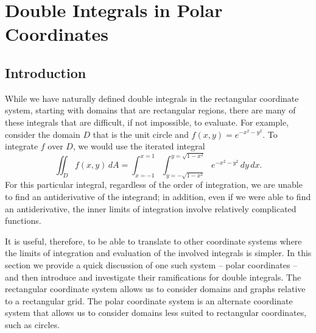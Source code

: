 \section{Double Integrals in Polar Coordinates} \label{S:11.5.Double_Integrals_Polar}

\vspace*{-14 pt}


\subsection*{Introduction}

While we have naturally defined double integrals in the rectangular coordinate system, starting with domains that are rectangular regions, there are many of these integrals that are difficult, if not impossible, to evaluate.  For example, consider the domain $D$ that is the unit circle and $f(x,y) = e^{-x^2 - y^2}$.  To integrate $f$ over $D$, we would use the iterated integral
$$\iint_D f(x,y) \, dA = \int_{x = -1}^{x = 1} \int_{y = -\sqrt{1-x^2}}^{y = \sqrt{1-x^2}} e^{-x^2 - y^2} \, dy \, dx.$$
For this particular integral, regardless of the order of integration, we are unable to find an antiderivative of the integrand; in addition, even if we were able to find an antiderivative, the inner limits of integration involve relatively complicated functions.

It is useful, therefore, to be able to translate to other coordinate systems where the limits of integration and evaluation of the involved integrals is simpler.  In this section we provide a quick discussion of one such system -- polar coordinates -- and then introduce and investigate their ramifications for double integrals.  The rectangular coordinate system allows us to consider domains and graphs relative to a rectangular grid. The polar coordinate system is an alternate coordinate system that allows us to consider domains less suited to rectangular coordinates, such as circles.

